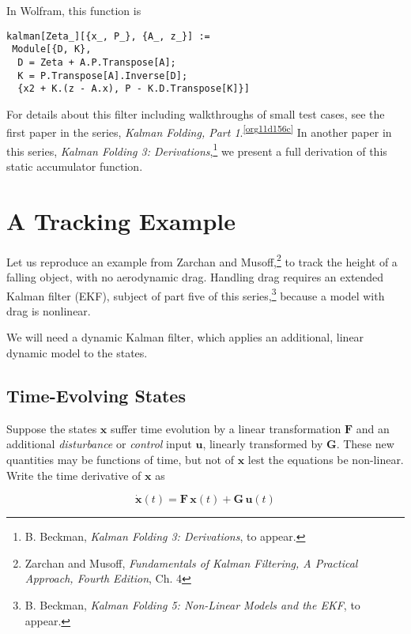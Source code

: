 \documentclass[10pt,oneside,x11names]{article}
\begin{document}
In Wolfram, this function is

\begin{verbatim}
kalman[Zeta_][{x_, P_}, {A_, z_}] :=
 Module[{D, K},
  D = Zeta + A.P.Transpose[A];
  K = P.Transpose[A].Inverse[D];
  {x2 + K.(z - A.x), P - K.D.Transpose[K]}]
\end{verbatim}

For details about this filter including walkthroughs of small test cases, see the first
paper in the series, \emph{Kalman Folding, Part 1}.\textsuperscript{\ref{org11d156c}}
In another paper in this series, \emph{Kalman Folding 3: Derivations},\footnote{B. Beckman, \emph{Kalman Folding 3: Derivations}, to appear.} we
present a full derivation of this static accumulator function.

\section{A Tracking Example}
\label{sec:org1a803ae}

Let us reproduce an example from Zarchan and Musoff,\footnote{Zarchan and Musoff, \emph{Fundamentals of Kalman Filtering, A Practical
Approach, Fourth Edition}, Ch. 4} to track the
height of a falling object, with no aerodynamic drag. Handling drag requires an
extended Kalman filter (EKF), subject of part five of this series,\footnote{B. Beckman, \emph{Kalman Folding 5: Non-Linear Models and the EKF}, to appear.}
because a model with drag is nonlinear.

We will need a dynamic Kalman filter, which applies an additional, linear
dynamic model to the states. 

\subsection{Time-Evolving States}
\label{sec:org638a855}

Suppose the states \(\mathbold{x}\) suffer time evolution by a linear
transformation \(\mathbold{F}\) and an additional \emph{disturbance} or \emph{control} input
\(\mathbold{u}\), linearly transformed by \(\mathbold{G}\).
These new quantities may
be functions of time, but not of \(\mathbold{x}\) lest the equations be
non-linear. Write
the time derivative of \(\mathbold{x}\) as

\begin{equation*}
{\dot{\mathbold{x}}}(t)=\mathbold{F}\,\mathbold{x}(t)+\mathbold{G}\,\mathbold{u}(t)
\end{equation*}
\end{document}
